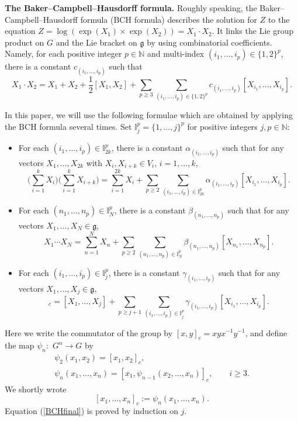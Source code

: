\documentclass[pdftex]{sigma}
\numberwithin{equation}{section}
\newcommand{\g}{\mathfrak{g}}
\newcommand{\N}{\mathbb{N}}
\begin{document}
{\bf The Baker--Campbell--Hausdorff formula.}
Roughly speaking,
the Baker--Campbell--Haus\-dorff formula (BCH formula) describes the solution for $Z$ to the equation $Z=\log(\exp(X_1)\times\exp(X_2))=X_1\cdot X_2$.
It links the Lie group product on $G$ and the Lie bracket on $\g$ by using combinatorial coefficients.
Namely,
for each positive integer $p\in\N$ and multi-index $(i_1,\dots,i_p)\in\{1,2\}^p$,
there is a constant $c_{(i_1,\dots,i_p)}$ such that
\[
X_1\cdot X_2=X_1+X_2+\frac{1}{2}[X_1,X_2]+\sum_{p\geq 3}\sum_{(i_1,\dots,i_p)\in \{1,2\}^p}c_{(i_1,\dots,i_p)}[X_{i_1},\dots,X_{i_p}].
\]

In this paper,
we will use the following formulae which are obtained by applying the BCH formula several times.
Set $\mathbb{I}_j^p=\{1,\dots,j\}^p$ for positive integers $j,p\in\N$:
\begin{itemize}\itemsep=0pt
 \item For each $(i_1,\dots,i_p)\!\in\!\mathbb{I}_{2k}^p$,
 there is a constant $\alpha_{(i_1,\dots,i_p)}$ such that for any vectors $X_1,\dots,X_{2k}$ with $X_i,X_{i+k}\in V_i$, $i=1,\dots,k$,
 \begin{equation}
 \Bigg(\sum_{i=1}^kX_i\Bigg)\Bigg(\sum_{i=1}^k X_{i+k}\Bigg)=\sum_{i=1}^{2k}X_i+\sum_{p\geq 2}\sum_{(i_1,\dots,i_p)\in \mathbb{I}_{2k}^p}\alpha_{(i_1,\dots,i_p)}[X_{i_1},\dots,X_{i_p}].\label{BCH1}
 \end{equation}
 \item For each $(n_1,\dots,n_p)\in\mathbb{I}_N^p$,
 there is a constant $\beta_{(n_1,\dots,n_p)}$ such that for any vectors $X_1,\dots,\allowbreak X_N\in\g$,
\begin{equation}
 X_1\cdots X_N
 =\sum_{n=1}^NX_n+\sum_{p\geq 2}\sum_{(n_1,\dots,n_p)\in\mathbb{I}_N^p}\beta_{(n_1,\dots,n_p)}[X_{n_1},\dots,X_{n_p}].\label{BCH2}
\end{equation}
\item For each $(i_1,\dots,i_p)\in\mathbb{I}_j^{p}$,
there is a constant $\gamma_{(i_1,\dots,i_p)}$ such that for any vectors $X_1,\dots,\allowbreak X_j\in\g$,
\begin{equation}
[X_1,\dots,X_j]_c
=[X_1,\dots,X_j]+\sum_{p\geq j+1}\sum_{(i_1,\dots,i_p)\in\mathbb{I}_j^p}\gamma_{(i_1,\dots,i_p)}[X_{i_1},\dots,X_{i_p}].\label{BCHfinal}
\end{equation}
\end{itemize}
Here we write the commutator of the group by $[x,y]_c=xyx^{-1}y^{-1}$,
and define the map $\psi_n{:}$ $G^n\to G$ by
\begin{gather*}
\psi_2(x_1,x_2)=[x_1,x_2]_c,
\\
\psi_n(x_1,\dots,x_n)=[x_1,\psi_{n-1}(x_2,\dots,x_n)]_c, \qquad i\geq 3.
\end{gather*}
We shortly wrote
\[
[x_1,\dots,x_n]_c:=\psi_n(x_1,\dots,x_n).
\]
Equation (\ref{BCHfinal}) is proved by induction on $j$.
\end{document}
